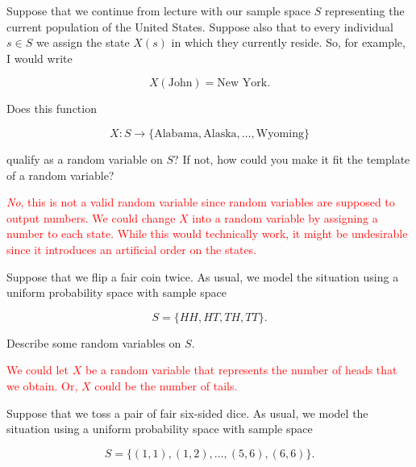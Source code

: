 \documentclass[12pt,reqno]{amsart}
\begin{document}
\bigskip

\prob Suppose that we continue from lecture with our sample space $S$ representing the current population of the United States. Suppose also that to every individual $s\in S$ we assign the state $X(s)$ in which they currently reside. So, for example, I would write

	\[
	X(\text{John}) = \text{New York}.
	\]

Does this function

	\[
	X: S \to \{\text{Alabama}, \text{Alaska},\ldots,\text{Wyoming}\}
	\]

qualify as a random variable on $S$? If not, how could you make it fit the template of a random variable?

\bigskip
\textcolor{red}{\textit{No}, this is not a valid random variable since random variables are supposed to output numbers. We could change $X$ into a random variable by assigning a number to each state. While this would technically work, it might be undesirable since it introduces an artificial order on the states.}
\bigskip
















\bigskip
\prob Suppose that we flip a fair coin twice. As usual, we model the situation using a uniform probability space with sample space

	\[
	S = \{ HH, HT, TH, TT\}.
	\]

Describe some random variables on $S$.

\bigskip
\textcolor{red}{We could let $X$ be a random variable that represents the number of heads that we obtain. Or, $X$ could be the number of tails.}
\bigskip

















\bigskip

\prob Suppose that we toss a pair of fair six-sided dice. As usual, we model the situation using a uniform probability space with sample space

	\[
	S = \{(1,1),(1,2),\ldots,(5,6),(6,6)\}.
	\]
\end{document}
